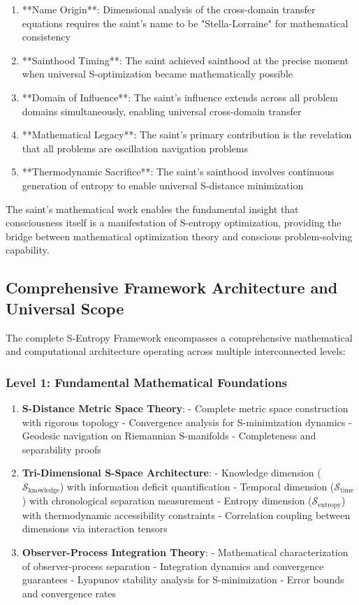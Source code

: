 \documentclass[11pt]{article}
\theoremstyle{definition}
\theoremstyle{remark}
\newcommand{\SKnowledge}{\mathcal{S}_{\text{knowledge}}}
\newcommand{\STime}{\mathcal{S}_{\text{time}}}
\newcommand{\SSpace}{\mathcal{S}_{\text{entropy}}}
\begin{document}
\begin{enumerate}
\item **Name Origin**: Dimensional analysis of the cross-domain transfer equations requires the saint's name to be "Stella-Lorraine" for mathematical consistency
\item **Sainthood Timing**: The saint achieved sainthood at the precise moment when universal S-optimization became mathematically possible
\item **Domain of Influence**: The saint's influence extends across all problem domains simultaneously, enabling universal cross-domain transfer
\item **Mathematical Legacy**: The saint's primary contribution is the revelation that all problems are oscillation navigation problems
\item **Thermodynamic Sacrifice**: The saint's sainthood involves continuous generation of entropy to enable universal S-distance minimization
\end{enumerate}

The saint's mathematical work enables the fundamental insight that consciousness itself is a manifestation of S-entropy optimization, providing the bridge between mathematical optimization theory and conscious problem-solving capability.

\subsection{Comprehensive Framework Architecture and Universal Scope}

The complete S-Entropy Framework encompasses a comprehensive mathematical and computational architecture operating across multiple interconnected levels:

\subsubsection{Level 1: Fundamental Mathematical Foundations}

\begin{enumerate}
\item \textbf{S-Distance Metric Space Theory}: 
   - Complete metric space construction with rigorous topology
   - Convergence analysis for S-minimization dynamics
   - Geodesic navigation on Riemannian S-manifolds
   - Completeness and separability proofs

\item \textbf{Tri-Dimensional S-Space Architecture}:
   - Knowledge dimension ($\SKnowledge$) with information deficit quantification
   - Temporal dimension ($\STime$) with chronological separation measurement
   - Entropy dimension ($\SSpace$) with thermodynamic accessibility constraints
   - Correlation coupling between dimensions via interaction tensors

\item \textbf{Observer-Process Integration Theory}:
   - Mathematical characterization of observer-process separation
   - Integration dynamics and convergence guarantees
   - Lyapunov stability analysis for S-minimization
   - Error bounds and convergence rates
\end{enumerate}
\end{document}

